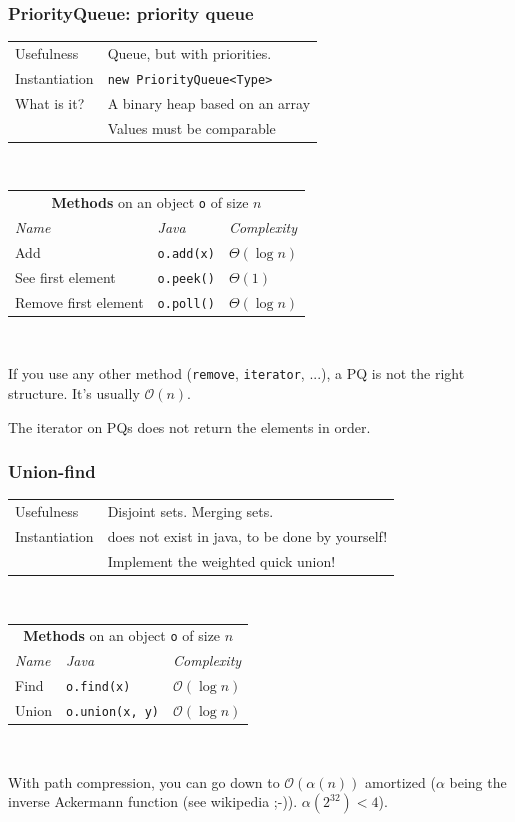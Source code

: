 \documentclass[8pt,aspectratio=169]{beamer}
\begin{document}
\begin{frame}
\frametitle{PriorityQueue: priority queue}
\centering
\begin{tabular}{ll}
	Usefulness & Queue, but with priorities.\\
	Instantiation & \texttt{new PriorityQueue<Type>}\\
	What is it? & A binary heap based on an array\\
	& \color{red} Values must be comparable
	
\end{tabular}\\
\vspace{0.5cm}
\centering
\begin{tabular}{lll}
	\multicolumn{3}{c}{\textbf{Methods} on an object \texttt{o} of size $n$} \\
	\textit{Name} & \textit{Java} & \textit{Complexity} \\
	Add & \texttt{o.add(x)} & $\Theta(\log n)$\\
	See first element & \texttt{o.peek()} & $\Theta(1)$\\
	Remove first element & \texttt{o.poll()} & $\Theta(\log n)$
\end{tabular}\\
\vspace{0.5cm}

\color{red} If you use any other method (\texttt{remove}, \texttt{iterator}, ...), a PQ is not the right structure. It's usually $\mathcal{O}(n)$.

\color{red} The iterator on PQs does not return the elements in order.
\end{frame}

\begin{frame}
\frametitle{Union-find}
\centering
\begin{tabular}{ll}
	Usefulness & Disjoint sets. Merging sets.\\
	Instantiation & does not exist in java, to be done by yourself!\\
	& \color{red} Implement the weighted quick union!
	
\end{tabular}\\
\vspace{0.5cm}
\centering
\begin{tabular}{lll}
	\multicolumn{3}{c}{\textbf{Methods} on an object \texttt{o} of size $n$} \\
	\textit{Name} & \textit{Java} & \textit{Complexity} \\
	Find & \texttt{o.find(x)} & $\mathcal{O}(\log n)$\\
	Union & \texttt{o.union(x, y)} & $\mathcal{O}(\log n)$
\end{tabular}\\
\vspace{0.5cm}

\color{blue} With path compression, you can go down to $\mathcal{O}(\alpha(n))$ amortized ($\alpha$ being the inverse Ackermann function (see wikipedia ;-)). $\alpha(2^{32}) < 4$).
\end{frame}
\end{document}

